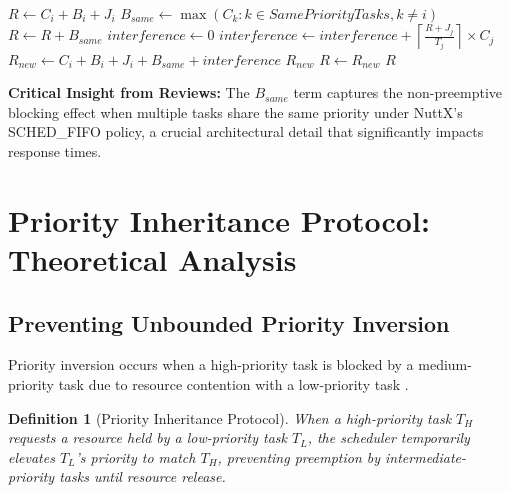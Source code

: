 \documentclass[12pt,a4paper]{article}
\newtheorem{definition}{Definition}
\begin{document}
\begin{algorithm}[H]
\caption{Complete RTA Convergence with Same-Priority Blocking}
\begin{algorithmic}[1]
    \State $R \gets C_i + B_i + J_i$
    \State $B_{same} \gets \max(C_k : k \in SamePriorityTasks, k \neq i)$ 
    \State $R \gets R + B_{same}$
        \State $interference \gets 0$
            \State $interference \gets interference + \left\lceil \frac{R + J_j}{T_j} \right\rceil \times C_j$ 
        \EndFor
        \State $R_{new} \gets C_i + B_i + J_i + B_{same} + interference$
            \State \Return $R_{new}$ 
        \EndIf
        \State $R \gets R_{new}$
    \EndFor
    \State \Return $R$ 
\EndFunction
\end{algorithmic}
\end{algorithm}

\textbf{Critical Insight from Reviews:} The $B_{same}$ term captures the non-preemptive blocking effect when multiple tasks share the same priority under NuttX's SCHED\_FIFO policy, a crucial architectural detail that significantly impacts response times.

\section{Priority Inheritance Protocol: Theoretical Analysis}

\subsection{Preventing Unbounded Priority Inversion}

Priority inversion occurs when a high-priority task is blocked by a medium-priority task due to resource contention with a low-priority task \cite{sha1990}.

\begin{definition}[Priority Inheritance Protocol]
When a high-priority task $T_H$ requests a resource held by a low-priority task $T_L$, the scheduler temporarily elevates $T_L$'s priority to match $T_H$, preventing preemption by intermediate-priority tasks until resource release.
\end{definition}
\end{document}
